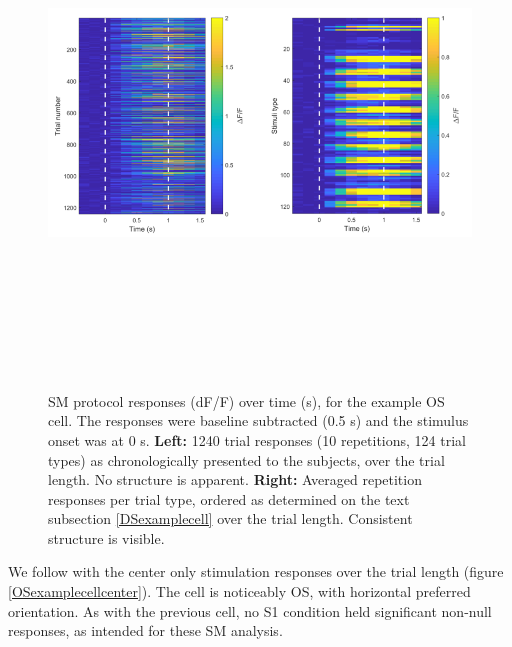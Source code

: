 \begin{figure}[H] \centering \includegraphics[width=14cm,height=14cm,keepaspectratio]{Figures/7.Results/individualSM/roi_46_mf379_pos2/roi46.png} 
\caption{SM protocol responses (dF/F) over time (s), for the example OS cell. The responses were baseline subtracted (0.5 s) and the stimulus onset was at 0 s.
\newline \textbf{Left:} 1240 trial responses (10 repetitions, 124 trial types) as chronologically presented to the subjects, over the trial length. No structure is apparent.
\newline \textbf{Right:} Averaged repetition responses per trial type, ordered as determined on the text subsection \ref{DSexamplecell} over the trial length. Consistent structure is visible. \label{individualOStrials}}
\end{figure}

We follow with the center only stimulation responses over the trial length (figure \ref{OSexamplecellcenter}). The cell is noticeably OS, with horizontal preferred orientation. As with the previous cell, no S1 condition held significant non-null responses, as intended for these SM analysis.

